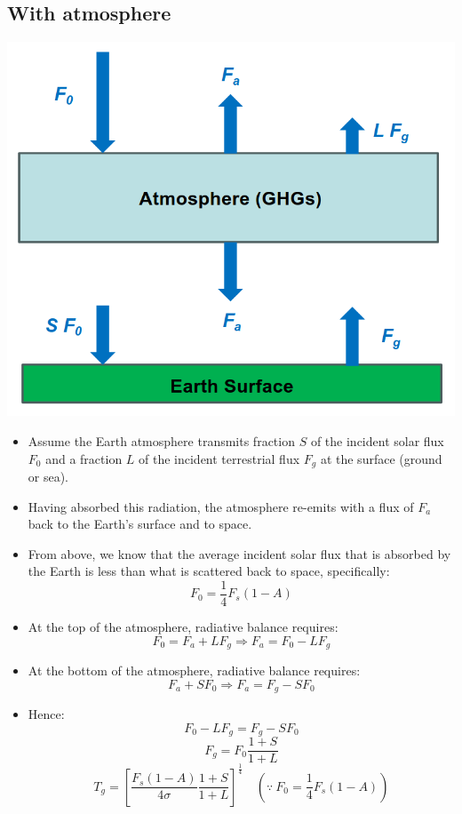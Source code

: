 \documentclass[11pt]{article}
\begin{document}
\subsection{With atmosphere}
\label{sec:orgcd1efb8}

\begin{center}
\includegraphics[scale=0.6]{./images/radiative-balance-model-with-atmosphere.png}
\end{center}

\begin{itemize}
\item Assume the Earth atmosphere transmits fraction \(S\) of the incident solar flux \(F_0\) and a fraction \(L\) of the incident terrestrial flux \(F_g\) at the surface (ground or sea).
\item Having absorbed this radiation, the atmosphere re-emits with a flux of \(F_a\) back to the Earth's surface and to space.
\item From above, we know that the average incident solar flux that is absorbed by the Earth is less than what is scattered back to space, specifically:
\[F_0 = \frac{1}{4} F_s (1-A)\]

\item At the top of the atmosphere, radiative balance requires:
\[F_0 = F_a + LF_g \Rightarrow F_a = F_0 - LF_g\]

\item At the bottom of the atmosphere, radiative balance requires:
\[F_a + SF_0 \Rightarrow F_a = F_g - SF_0\]

\item Hence:
\[F_0 - LF_g = F_g - SF_0\]
\[F_g = F_0 \frac{1+ S}{1 + L}\]
\[T_g = \left[\frac{F_s(1 - A)}{4 \sigma} \frac{1+S}{1+L} \right]^{\frac{1}{4}} \quad \left(\because \ F_0 = \frac{1}{4} F_s (1 - A) \right)\]
\end{itemize}
\end{document}
